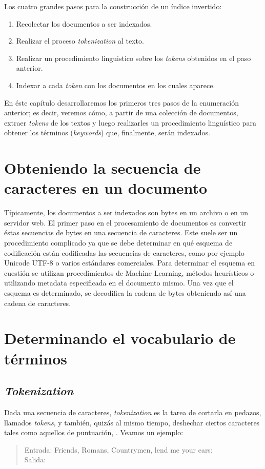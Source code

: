 Los cuatro grandes pasos para la construcción de un índice invertido:
\begin{enumerate}
	\item Recolectar los documentos a ser indexados.
	\item Realizar el proceso \textit{tokenization} al texto.
	\item Realizar un procedimiento linguistico sobre los \textit{tokens} obtenidos en el paso anterior.
	\item Indexar a cada \textit{token} con los documentos en los cuales aparece.
\end{enumerate}

En éste capítulo desarrollaremos los primeros tres pasos de la enumeración anterior; es decir, veremos cómo, a partir de una colección de documentos, extraer \textit{tokens} de los textos y luego realizarles un procedimiento linguístico para obtener los términos (\textit{keywords}) que, finalmente, serán indexados.

\section{Obteniendo la secuencia de caracteres en un documento}
	Típicamente, los documentos a ser indexados son bytes en un archivo o en un servidor web. El primer paso en el procesamiento de documentos es convertir éstas secuencias de bytes en una secuencia de caracteres. Este suele ser un procedimiento complicado ya que se debe determinar en qué esquema de codificación están codificadas las secuencias de caracteres, como por ejemplo Unicode UTF-8 o varios estándares comerciales. Para determinar el esquema en cuestión se utilizan procedimientos de Machine Learning, métodos heurísticos o utilizando metadata especificada en el documento mismo. Una vez que el esquema es determinado, se decodifica la cadena de bytes obteniendo así una cadena de caracteres.
	
\section{Determinando el vocabulario de términos}
	\subsection{\textit{Tokenization}}
		Dada una secuencia de caracteres, \textit{tokenization} es la tarea de cortarla en pedazos, llamados \textit{tokens}, y también, quizás al mismo tiempo, deshechar ciertos caracteres tales como aquellos de puntuación, \cite{manning2009}. Veamos un ejemplo:
		\begin{quote}
			Entrada: Friends, Romans, Countrymen, lend me your ears; \\
			Salida:       
		\end{quote}
		
